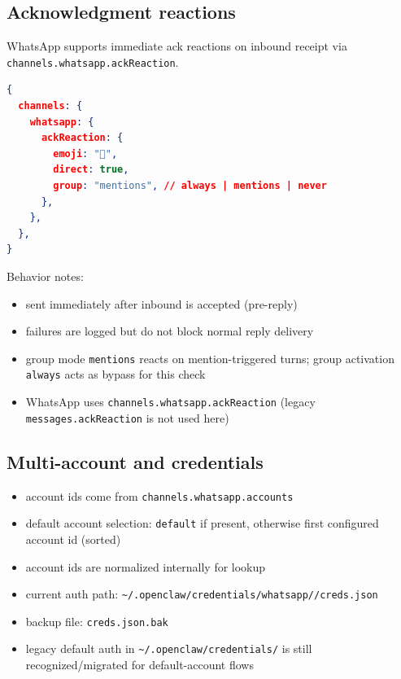 \subsection{Acknowledgment reactions}


WhatsApp supports immediate ack reactions on inbound receipt via \texttt{channels.whatsapp.ackReaction}.

\begin{lstlisting}[language=json]
{
  channels: {
    whatsapp: {
      ackReaction: {
        emoji: "👀",
        direct: true,
        group: "mentions", // always | mentions | never
      },
    },
  },
}
\end{lstlisting}


Behavior notes:

\begin{itemize}
  \item sent immediately after inbound is accepted (pre-reply)
  \item failures are logged but do not block normal reply delivery
  \item group mode \texttt{mentions} reacts on mention-triggered turns; group activation \texttt{always} acts as bypass for this check
  \item WhatsApp uses \texttt{channels.whatsapp.ackReaction} (legacy \texttt{messages.ackReaction} is not used here)
\end{itemize}


\subsection{Multi-account and credentials}


\begin{itemize}
  \item account ids come from \texttt{channels.whatsapp.accounts}
  \item default account selection: \texttt{default} if present, otherwise first configured account id (sorted)
  \item account ids are normalized internally for lookup
\end{itemize}


\begin{itemize}
  \item current auth path: \texttt{\textasciitilde{}/.openclaw/credentials/whatsapp//creds.json}
  \item backup file: \texttt{creds.json.bak}
  \item legacy default auth in \texttt{\textasciitilde{}/.openclaw/credentials/} is still recognized/migrated for default-account flows
\end{itemize}


